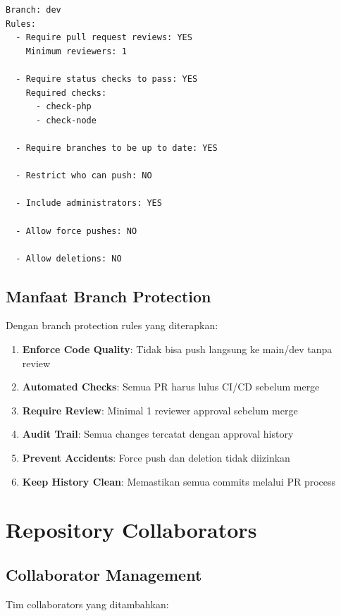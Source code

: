 \documentclass[a4paper,oneside,11pt]{book}
\begin{document}
\begin{lstlisting}[style=yamlStyle, caption={Branch Protection Rules - dev}, label={kode:devprotection}]
Branch: dev
Rules:
  - Require pull request reviews: YES
    Minimum reviewers: 1
  
  - Require status checks to pass: YES
    Required checks:
      - check-php
      - check-node
  
  - Require branches to be up to date: YES
  
  - Restrict who can push: NO
  
  - Include administrators: YES
  
  - Allow force pushes: NO
  
  - Allow deletions: NO
\end{lstlisting}

\subsection{Manfaat Branch Protection}

Dengan branch protection rules yang diterapkan:

\begin{enumerate}
    \item \textbf{Enforce Code Quality}: Tidak bisa push langsung ke main/dev tanpa review
    \item \textbf{Automated Checks}: Semua PR harus lulus CI/CD sebelum merge
    \item \textbf{Require Review}: Minimal 1 reviewer approval sebelum merge
    \item \textbf{Audit Trail}: Semua changes tercatat dengan approval history
    \item \textbf{Prevent Accidents}: Force push dan deletion tidak diizinkan
    \item \textbf{Keep History Clean}: Memastikan semua commits melalui PR process
\end{enumerate}

\newpage

\section{Repository Collaborators}

\subsection{Collaborator Management}

Tim collaborators yang ditambahkan:
\end{document}
